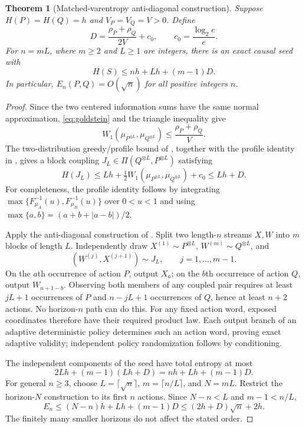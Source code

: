 \documentclass[11pt,a4paper]{article}
\newtheorem{theorem}{Theorem}
\newcommand{\cst}{c_0}
\begin{document}
\begin{theorem}[Matched-varentropy anti-diagonal construction]\label{thm:upper}
Suppose $H(P)=H(Q)=h$ and $V_P=V_Q=V>0$. Define
\[
D=\frac{\rho_P+\rho_Q}{2V}+\cst,
\qquad \cst=\frac{\log_2 e}{e}.
\]
For $n=mL$, where $m\ge2$ and $L\ge1$ are integers, there is an exact
causal seed with
\begin{equation}\label{eq:upper}
H(S)\le nh+Lh+(m-1)D.
\end{equation}
In particular, $E_n(P,Q)=O(\sqrt n)$ for all positive integers $n$.
\end{theorem}
\begin{proof}
Since the two centered information sums have the same normal approximation,
\eqref{eq:goldstein} and the triangle inequality give
\[
W_1(\mu_{P^{\otimes L}},\mu_{Q^{\otimes L}})
\le \frac{\rho_P+\rho_Q}{V}.
\]
The two-distribution greedy/profile bound of \cite[Theorem 4.1]{compton},
together with the profile identity in \cite[Lemma 17.1]{mikulik}, gives a
block coupling $J_L\in\Pi(Q^{\otimes L},P^{\otimes L})$ satisfying
\[
H(J_L)\le Lh+
\tfrac12 W_1(\mu_{P^{\otimes L}},\mu_{Q^{\otimes L}})+\cst
\le Lh+D.
\]
For completeness, the profile identity follows by integrating
$\max\{F_{\mu_A}^{-1}(u),F_{\mu_B}^{-1}(u)\}$ over $0<u<1$ and using
$\max\{a,b\}=(a+b+|a-b|)/2$.

Apply the anti-diagonal construction of \cite[Section 18]{mikulik}.
Split two length-$n$ streams $X,W$ into $m$ blocks of length $L$.
Independently draw $X^{(1)}\sim P^{\otimes L}$,
$W^{(m)}\sim Q^{\otimes L}$, and
\[
(W^{(j)},X^{(j+1)})\sim J_L,\qquad j=1,\ldots,m-1.
\]
On the $a$th occurrence of action $P$, output $X_a$; on the $b$th
occurrence of action $Q$, output $W_{n+1-b}$.
Observing both members of any coupled pair requires at least
$jL+1$ occurrences of $P$ and $n-jL+1$ occurrences of $Q$, hence at
least $n+2$ actions. No horizon-$n$ path can do this.
For any fixed action word, exposed coordinates therefore have their
required product law. Each output branch of an adaptive deterministic
policy determines such an action word, proving exact adaptive validity;
independent policy randomization follows by conditioning.

The independent components of the seed have total entropy at most
\[
2Lh+(m-1)(Lh+D)=nh+Lh+(m-1)D.
\]
For general $n\ge3$, choose $L=\lceil\sqrt n\rceil$,
$m=\lceil n/L\rceil$, and $N=mL$. Restrict the horizon-$N$ construction
to its first $n$ actions. Since $N-n<L$ and $m-1<n/L$,
\[
E_n\le (N-n)h+Lh+(m-1)D
\le (2h+D)\sqrt n+2h.
\]
The finitely many smaller horizons do not affect the stated order.
\end{proof}
\end{document}
